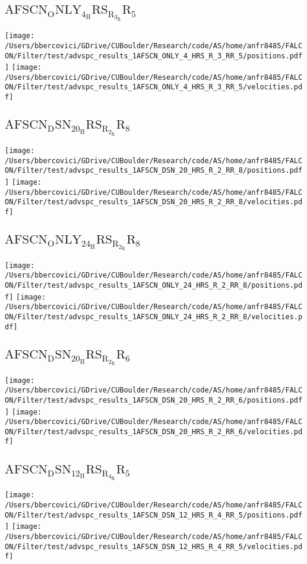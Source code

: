 \subsection{$\mathrm{AFSCN_ONLY_4_HRS_R_3_RR_5}$}
\texttt{[image: /Users/bbercovici/GDrive/CUBoulder/Research/code/AS/home/anfr8485/FALCON/Filter/test/advspc\_results\_1AFSCN\_ONLY\_4\_HRS\_R\_3\_RR\_5/positions.pdf]}
\texttt{[image: /Users/bbercovici/GDrive/CUBoulder/Research/code/AS/home/anfr8485/FALCON/Filter/test/advspc\_results\_1AFSCN\_ONLY\_4\_HRS\_R\_3\_RR\_5/velocities.pdf]}
\subsection{$\mathrm{AFSCN_DSN_20_HRS_R_2_RR_8}$}
\texttt{[image: /Users/bbercovici/GDrive/CUBoulder/Research/code/AS/home/anfr8485/FALCON/Filter/test/advspc\_results\_1AFSCN\_DSN\_20\_HRS\_R\_2\_RR\_8/positions.pdf]}
\texttt{[image: /Users/bbercovici/GDrive/CUBoulder/Research/code/AS/home/anfr8485/FALCON/Filter/test/advspc\_results\_1AFSCN\_DSN\_20\_HRS\_R\_2\_RR\_8/velocities.pdf]}
\subsection{$\mathrm{AFSCN_ONLY_24_HRS_R_2_RR_8}$}
\texttt{[image: /Users/bbercovici/GDrive/CUBoulder/Research/code/AS/home/anfr8485/FALCON/Filter/test/advspc\_results\_1AFSCN\_ONLY\_24\_HRS\_R\_2\_RR\_8/positions.pdf]}
\texttt{[image: /Users/bbercovici/GDrive/CUBoulder/Research/code/AS/home/anfr8485/FALCON/Filter/test/advspc\_results\_1AFSCN\_ONLY\_24\_HRS\_R\_2\_RR\_8/velocities.pdf]}
\subsection{$\mathrm{AFSCN_DSN_20_HRS_R_2_RR_6}$}
\texttt{[image: /Users/bbercovici/GDrive/CUBoulder/Research/code/AS/home/anfr8485/FALCON/Filter/test/advspc\_results\_1AFSCN\_DSN\_20\_HRS\_R\_2\_RR\_6/positions.pdf]}
\texttt{[image: /Users/bbercovici/GDrive/CUBoulder/Research/code/AS/home/anfr8485/FALCON/Filter/test/advspc\_results\_1AFSCN\_DSN\_20\_HRS\_R\_2\_RR\_6/velocities.pdf]}
\subsection{$\mathrm{AFSCN_DSN_12_HRS_R_4_RR_5}$}
\texttt{[image: /Users/bbercovici/GDrive/CUBoulder/Research/code/AS/home/anfr8485/FALCON/Filter/test/advspc\_results\_1AFSCN\_DSN\_12\_HRS\_R\_4\_RR\_5/positions.pdf]}
\texttt{[image: /Users/bbercovici/GDrive/CUBoulder/Research/code/AS/home/anfr8485/FALCON/Filter/test/advspc\_results\_1AFSCN\_DSN\_12\_HRS\_R\_4\_RR\_5/velocities.pdf]}

